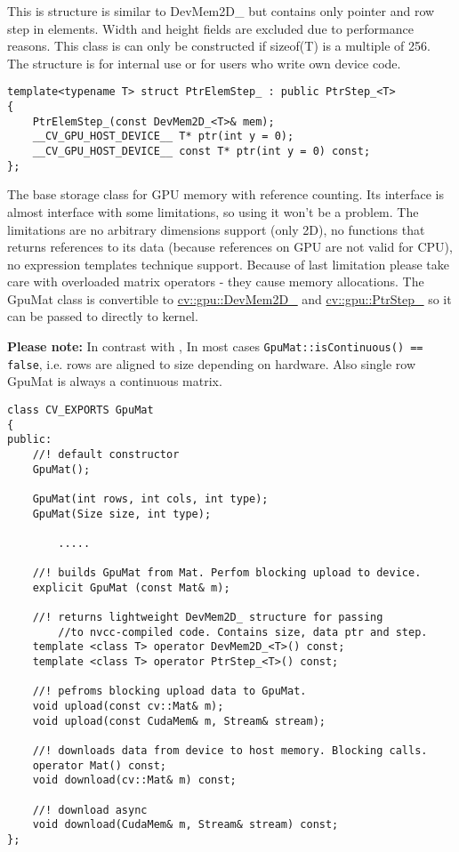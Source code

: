 This is structure is similar to DevMem2D\_ but contains only pointer and row step in elements. Width and height fields are excluded due to performance reasons. This class is can only be constructed if sizeof(T) is a multiple of 256. The structure is for internal use or for users who write own device code.

\begin{lstlisting}
template<typename T> struct PtrElemStep_ : public PtrStep_<T>
{                   
	PtrElemStep_(const DevMem2D_<T>& mem);
	__CV_GPU_HOST_DEVICE__ T* ptr(int y = 0);
	__CV_GPU_HOST_DEVICE__ const T* ptr(int y = 0) const;
};
\end{lstlisting}



The base storage class for GPU memory with reference counting. Its interface is almost  interface with some limitations, so using it won't be a problem. The limitations are no arbitrary dimensions support (only 2D), no functions that returns references to its data (because references on GPU are not valid for CPU), no expression templates technique support. Because of last limitation please take care with overloaded matrix operators - they cause memory allocations. The GpuMat class is convertible to  \hyperref[cppfunc.gpu.DevMem2D]{cv::gpu::DevMem2D\_} and  \hyperref[cppfunc.gpu.PtrStep]{cv::gpu::PtrStep\_} so it can be passed to directly to kernel.




\textbf{Please note:} In contrast with , In most cases \texttt{GpuMat::isContinuous() == false}, i.e. rows are aligned to size depending on hardware. Also single row GpuMat is always a continuous matrix.

\begin{lstlisting}
class CV_EXPORTS GpuMat
{
public:
	//! default constructor
	GpuMat();

	GpuMat(int rows, int cols, int type);
	GpuMat(Size size, int type);

        .....

	//! builds GpuMat from Mat. Perfom blocking upload to device.
	explicit GpuMat (const Mat& m);

	//! returns lightweight DevMem2D_ structure for passing 
        //to nvcc-compiled code. Contains size, data ptr and step.
	template <class T> operator DevMem2D_<T>() const;
	template <class T> operator PtrStep_<T>() const;

	//! pefroms blocking upload data to GpuMat.
	void upload(const cv::Mat& m);
	void upload(const CudaMem& m, Stream& stream);

	//! downloads data from device to host memory. Blocking calls.
	operator Mat() const;
	void download(cv::Mat& m) const;

	//! download async
	void download(CudaMem& m, Stream& stream) const;
};
\end{lstlisting}

